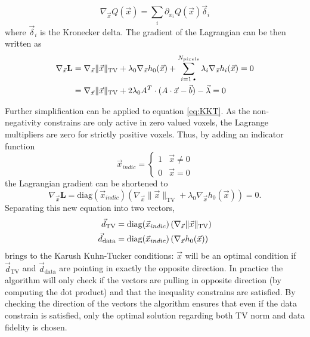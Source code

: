 \begin{equation}
\nabla_{\vec{x}}Q(\vec{x})=\sum_i {\partial_{x_i}}Q(\vec{x}) \vec{\delta}_i
\end{equation}
where $\vec{\delta}_i$ is the Kronecker delta. The gradient of the Lagrangian can be then written as
\begin{align}
\nabla_{\vec{x}}\textbf{L}&=\nabla_{\vec{x}}\lVert \vec{x} \rVert_\text{TV}+\lambda_0\nabla_{\vec{x}}h_0(\vec{x})+\sum_{i=1\textit{•}}^{N_{pixels}}\lambda_i\nabla_{\vec{x}}h_i(\vec{x})=0 \notag \\
&=\nabla_{\vec{x}}\lVert \vec{x} \rVert_\text{TV}+2\lambda_0 A^T\cdot(A\cdot\vec{x}-\vec{b})-\vec{\lambda}=0 \label{eq:KKT}
\end{align}

Further simplification can be applied to equation \ref{eq:KKT}. As the non-negativity constrains are only active in zero valued voxels, the Lagrange multipliers are zero for strictly positive voxels. Thus, by adding an indicator function
\begin{equation}
\vec{x}_{indic}=
\begin{cases}
1 & \vec{x} \neq 0 \\
0 & \vec{x} = 0 
\end{cases}
\end{equation}
the Lagrangian gradient can be shortened to
\begin{equation}
\nabla_{\vec{x}}\textbf{L}=\text{diag}(\vec{x}_{indic})\left(\nabla_{\vec{x}}\lVert \vec{x} \rVert_\text{TV}+\lambda_0\nabla_{\vec{x}}h_0(\vec{x})\right)=0 .\label{eq:KKT2}
\end{equation}
Separating this new equation into two vectors,
\begin{align}
\vec{d}_{\text{TV}}&=\text{diag}(\vec{x}_{indic})\left(\nabla_{\vec{x}}\lVert \vec{x} \rVert_\text{TV}\right)\notag\\ 
\vec{d}_{\text{data}}&=\text{diag}(\vec{x}_{indic})\left(\nabla_{\vec{x}}h_0(\vec{x})\right)
\label{eq:KKTvectors}
\end{align}
brings to the Karush Kuhn-Tucker conditions: $\vec{x}$ will be an optimal condition if $\vec{d}_{\text{TV}}$ and $\vec{d}_{\text{data}}$ are pointing in exactly the opposite direction. In practice the algorithm will only check if the vectors are pulling in opposite direction (by computing the dot product) and that the inequality constrains are satisfied. By checking the direction of the vectors the algorithm ensures that even if the data constrain is satisfied, only the optimal solution regarding both TV norm and data fidelity is chosen.


